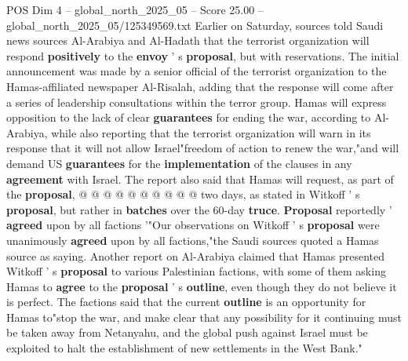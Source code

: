 \begin{textsample}{POS Dim 4 – global\_north\_2025\_05 – Score 25.00 – global\_north\_2025\_05/125349569.txt}
Earlier on Saturday, sources told Saudi news sources Al-Arabiya and Al-Hadath that the terrorist organization will respond \textbf{positively} to the \textbf{envoy} ' s \textbf{proposal}, but with reservations.
The initial announcement was made by a senior official of the terrorist organization to the Hamas-affiliated newspaper Al-Risalah, adding that the response will come after a series of leadership consultations within the terror group.
Hamas will express opposition to the lack of clear \textbf{guarantees} for ending the war, according to Al-Arabiya, while also reporting that the terrorist organization will warn in its response that it will not allow Israel"freedom of action to renew the war,"and will demand US \textbf{guarantees} for the \textbf{implementation} of the clauses in any \textbf{agreement} with Israel.
The report also said that Hamas will request, as part of the \textbf{proposal}, @ @ @ @ @ @ @ @ @ @ two days, as stated in Witkoff ' s \textbf{proposal}, but rather in \textbf{batches} over the 60-day \textbf{truce}. \textbf{Proposal} reportedly ' \textbf{agreed} upon by all factions '"Our observations on Witkoff ' s \textbf{proposal} were unanimously \textbf{agreed} upon by all factions,"the Saudi sources quoted a Hamas source as saying.
Another report on Al-Arabiya claimed that Hamas presented Witkoff ' s \textbf{proposal} to various Palestinian factions, with some of them asking Hamas to \textbf{agree} to the \textbf{proposal} ' s \textbf{outline}, even though they do not believe it is perfect.
The factions said that the current \textbf{outline} is an opportunity for Hamas to"stop the war, and make clear that any possibility for it continuing must be taken away from Netanyahu, and the global push against Israel must be exploited to halt the establishment of new settlements in the West Bank."

\end{textsample}
